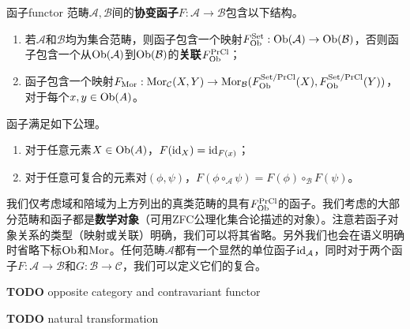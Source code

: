 \documentclass[../main.tex]{subfiles}
\begin{document}
\begin{definition}{函子}{functor}
范畴$\mathcal{A},\mathcal{B}$间的\textbf{协变函子}$F:\mathcal{A}\to\mathcal{B}$包含以下结构。
\begin{enumerate}
    \item 若$\mathcal{A}$和$\mathcal{B}$均为集合范畴，则函子包含一个映射$F_{\operatorname{Ob}}^{\text{Set}}:\operatorname{Ob}(\mathcal{A})\to\operatorname{Ob}(\mathcal{B})$，否则函子包含一个从$\operatorname{Ob}(\mathcal{A})$到$\operatorname{Ob}(\mathcal{B})$的\textbf{关联}$F_{\operatorname{Ob}}^{\text{PrCl}}$；
    \item 函子包含一个映射$F_{\operatorname{Mor}}:\operatorname{Mor}_\mathcal{C}(X,Y)\to\operatorname{Mor}_\mathcal{B}(F_{\operatorname{Ob}}^{\text{Set/PrCl}}(X),F_{\operatorname{Ob}}^{\text{Set/PrCl}}(Y))$，对于每个$x,y\in\operatorname{Ob}(A)$。
\end{enumerate}
函子满足如下公理。
\begin{enumerate}
    \item 对于任意元素$X\in\operatorname{Ob}(A)$，$F(\operatorname{id}_X)=\operatorname{id}_{F(x)}$；
    \item 对于任意可复合的元素对$(\phi,\psi)$，$F(\phi\circ_\mathcal{A}\psi)=F(\phi)\circ_\mathcal{B}F(\psi)$。
\end{enumerate}
\end{definition}
我们仅考虑域和陪域为上方列出的真类范畴的具有$F_{\operatorname{Ob}}^{\text{PrCl}}$的函子。我们考虑的大部分范畴和函子都是\textbf{数学对象}（可用ZFC公理化集合论描述的对象）。注意若函子对象关系的类型（映射或关联）明确，我们可以将其省略。另外我们也会在语义明确时省略下标$\operatorname{Ob}$和$\operatorname{Mor}$。任何范畴$\mathcal{A}$都有一个显然的单位函子$\operatorname{id}_\mathcal{A}$，同时对于两个函子$F:\mathcal{A}\to\mathcal{B}$和$G:\mathcal{B}\to\mathcal{C}$，我们可以定义它们的复合。

\textbf{TODO} opposite category and contravariant functor

\textbf{TODO} natural transformation
\end{document}
